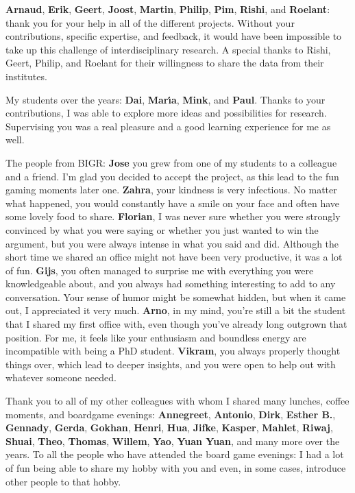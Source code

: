 \textbf{Arnaud}, \textbf{Erik}, \textbf{Geert}, \textbf{Joost}, \textbf{Martin}, \textbf{Philip}, \textbf{Pim}, \textbf{Rishi}, and \textbf{Roelant}: thank you for your help in all of the different projects.
Without your contributions, specific expertise, and feedback, it would have been impossible to take up this challenge of interdisciplinary research.
A special thanks to Rishi, Geert, Philip, and Roelant for their willingness to share the data from their institutes.

My students over the years: \textbf{Dai}, \textbf{Mar{\'\i}a}, \textbf{Mink}, and \textbf{Paul}.
Thanks to your contributions, I was able to explore more ideas and possibilities for research.
Supervising you was a real pleasure and a good learning experience for me as well.

The people from BIGR\@:
\textbf{Jose} you grew from one of my students to a colleague and a friend.
I'm glad you decided to accept the project, as this lead to the fun gaming moments later one.
\textbf{Zahra}, your kindness is very infectious.
No matter what happened, you would constantly have a smile on your face and often have some lovely food to share.
\textbf{Florian}, I was never sure whether you were strongly convinced by what you were saying or whether you just wanted to win the argument, but you were always intense in what you said and did.
Although the short time we shared an office might not have been very productive, it was a lot of fun.
\textbf{Gijs}, you often managed to surprise me with everything you were knowledgeable about, and you always had something interesting to add to any conversation.
Your sense of humor might be somewhat hidden, but when it came out, I appreciated it very much.
\textbf{Arno}, in my mind, you're still a bit the student that I shared my first office with, even though you've already long outgrown that position.
For me, it feels like your enthusiasm and boundless energy are incompatible with being a PhD student.
\textbf{Vikram}, you always properly thought things over, which lead to deeper insights, and you were open to help out with whatever someone needed.

Thank you to all of my other colleagues with whom I shared many lunches, coffee moments, and boardgame evenings:
\textbf{Annegreet}, \textbf{Antonio}, \textbf{Dirk}, \textbf{Esther B.}, \textbf{Gennady}, \textbf{Gerda}, \textbf{Gokhan}, \textbf{Henri}, \textbf{Hua}, \textbf{Jifke}, \textbf{Kasper}, \textbf{Mahlet}, \textbf{Riwaj}, \textbf{Shuai}, \textbf{Theo}, \textbf{Thomas}, \textbf{Willem}, \textbf{Yao}, \textbf{Yuan Yuan}, and many more over the years.
To all the people who have attended the board game evenings: I had a lot of fun being able to share my hobby with you and even, in some cases, introduce other people to that hobby.

